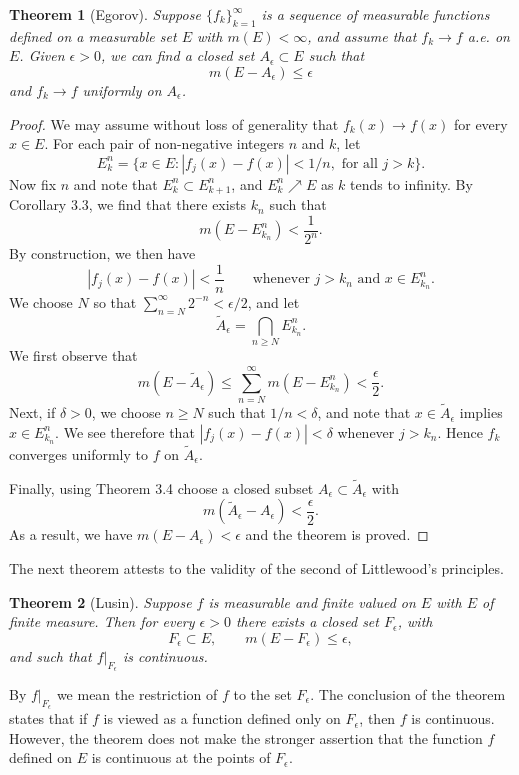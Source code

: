 \documentclass[11pt,openany]{book}
\newtheorem{theorem}{Theorem}[section]
\begin{document}
\begin{theorem}[Egorov]
Suppose $\{f_k\}_{k=1}^{\infty}$ is a sequence of measurable functions defined on a measurable set $E$ with $m(E)<\infty$, and assume that $f_k\to f$ a.e. on $E$. Given $\epsilon>0$, we can find a closed set $A_\epsilon\subset E$ such that
\[
 m(E-A_\epsilon)\le\epsilon
\]
and $f_k\to f$ uniformly on $A_\epsilon$.
\end{theorem}

\begin{proof}
We may assume without loss of generality that $f_k(x)\to f(x)$ for every $x\in E$. For each pair of non-negative integers $n$ and $k$, let
\[
 E_k^n=\{x\in E:|f_j(x)-f(x)|<1/n,\text{ for all }j>k\}.
\]
Now fix $n$ and note that $E_k^n\subset E_{k+1}^n$, and $E_k^n\nearrow E$ as $k$ tends to infinity. By Corollary 3.3, we find that there exists $k_n$ such that
\[
 m(E-E_{k_n}^n)<\frac1{2^n}.
\]
By construction, we then have
\[
 |f_j(x)-f(x)|<\frac1n
 \qquad\text{whenever }j>k_n\text{ and }x\in E_{k_n}^n.
\]
We choose $N$ so that $\sum_{n=N}^{\infty}2^{-n}<\epsilon/2$, and let
\[
 \widetilde A_\epsilon=\bigcap_{n\ge N}E_{k_n}^n.
\]
We first observe that
\[
 m(E-\widetilde A_\epsilon)
 \le\sum_{n=N}^{\infty}m(E-E_{k_n}^n)
 <\frac\epsilon2.
\]
Next, if $\delta>0$, we choose $n\ge N$ such that $1/n<\delta$, and note that $x\in\widetilde A_\epsilon$ implies $x\in E_{k_n}^n$. We see therefore that $|f_j(x)-f(x)|<\delta$ whenever $j>k_n$. Hence $f_k$ converges uniformly to $f$ on $\widetilde A_\epsilon$.

Finally, using Theorem 3.4 choose a closed subset $A_\epsilon\subset\widetilde A_\epsilon$ with
\[
 m(\widetilde A_\epsilon-A_\epsilon)<\frac\epsilon2.
\]
As a result, we have $m(E-A_\epsilon)<\epsilon$ and the theorem is proved.
\end{proof}

The next theorem attests to the validity of the second of Littlewood's principles.

\begin{theorem}[Lusin]
Suppose $f$ is measurable and finite valued on $E$ with $E$ of finite measure. Then for every $\epsilon>0$ there exists a closed set $F_\epsilon$, with
\[
 F_\epsilon\subset E,
 \qquad
 m(E-F_\epsilon)\le\epsilon,
\]
and such that $f|_{F_\epsilon}$ is continuous.
\end{theorem}

By $f|_{F_\epsilon}$ we mean the restriction of $f$ to the set $F_\epsilon$. The conclusion of the theorem states that if $f$ is viewed as a function defined only on $F_\epsilon$, then $f$ is continuous. However, the theorem does not make the stronger assertion that the function $f$ defined on $E$ is continuous at the points of $F_\epsilon$.
\end{document}
